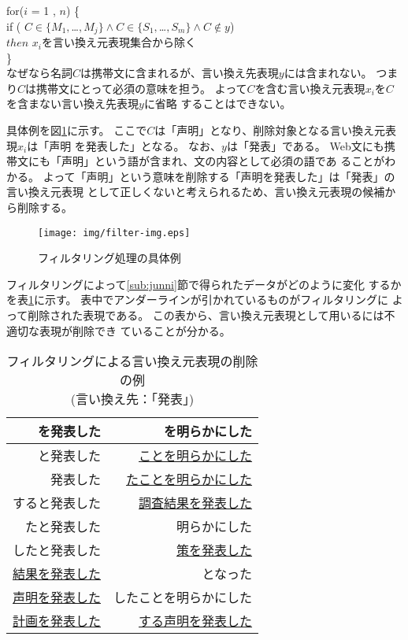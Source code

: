 \documentclass[jnlpbbl]{jnlp_j}
\begin{document}
for($i$ = 1 , $n$) \{\\
\hspace{2em}if ( $C \in \{M_{1},$…$, M_{j}\} \wedge C \in \{S_{1},$…$, S_{m}\} \wedge C \notin y$)\\
\hspace{2em}$then$ $x_i$を言い換え元表現集合から除く\\
\indent\}\\

なぜなら名詞$C$は携帯文に含まれるが、言い換え先表現$y$には含まれない。
つまり$C$は携帯文にとって必須の意味を担う。
よって$C$を含む言い換え元表現$x_i$を$C$を含まない言い換え先表現$y$に省略
することはできない。

具体例を図\ref{filter-img}に示す。
ここで$C$は「声明」となり、削除対象となる言い換え元表現$x_i$は「声明
を発表した」となる。
なお、$y$は「発表」である。
Web文にも携帯文にも「声明」という語が含まれ、文の内容として必須の語であ
ることがわかる。
よって「声明」という意味を削除する「声明を発表した」は「発表」の言い換え元表現
として正しくないと考えられるため、言い換え元表現の候補から削除する。

\begin{figure}[htb]
\begin{center}
\texttt{[image: img/filter-img.eps]}
\caption{フィルタリング処理の具体例}
\label{filter-img}
\end{center}
\end{figure}

フィルタリングによって\ref{sub:junni}節で得られたデータがどのように変化
するかを表\ref{filter-henka}に示す。
表中でアンダーラインが引かれているものがフィルタリングに
よって削除された表現である。
この表から、言い換え元表現として用いるには不適切な表現が削除でき
ていることが分かる。

\begin{table}[htb]
\caption{フィルタリングによる言い換え元表現の削除の例\\
(言い換え先：「発表」)}
\label{filter-henka}
\begin{center}
\begin{tabular}{|r|r|} \hline
を発表した             & を明らかにした \\\hline
と発表した             & \underline{ことを明らかにした} \\\hline
発表した               & \underline{たことを明らかにした} \\\hline
すると発表した         & \underline{調査結果を発表した} \\\hline
たと発表した           & 明らかにした \\\hline
したと発表した         & \underline{策を発表した} \\\hline
\underline{結果を発表した}& となった \\\hline
\underline{声明を発表した}& したことを明らかにした \\\hline
\underline{計画を発表した}& \underline{する声明を発表した} \\\hline
\end{tabular}
\end{center}
\end{table}
\end{document}
